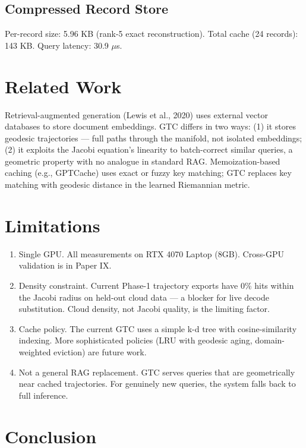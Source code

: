 \documentclass[11pt]{article}
\begin{document}
\subsection{Compressed Record Store}

Per-record size: 5.96 KB (rank-5 exact reconstruction). Total cache
(24 records): 143 KB. Query latency: 30.9 $\mu$s.

\section{Related Work}

Retrieval-augmented generation (Lewis et al., 2020) uses external vector
databases to store document embeddings. GTC differs in two ways: (1) it
stores geodesic trajectories --- full paths through the manifold,
not isolated embeddings; (2) it exploits the Jacobi equation's
linearity to batch-correct similar queries, a geometric property with
no analogue in standard RAG. Memoization-based caching (e.g., GPTCache)
uses exact or fuzzy key matching; GTC replaces key matching with
geodesic distance in the learned Riemannian metric.

\section{Limitations}

\begin{enumerate}
\item Single GPU. All measurements on RTX 4070 Laptop (8GB).
      Cross-GPU validation is in Paper IX.
\item Density constraint. Current Phase-1 trajectory exports
      have 0\% hits within the Jacobi radius on held-out cloud data ---
      a blocker for live decode substitution. Cloud density, not Jacobi
      quality, is the limiting factor.
\item Cache policy. The current GTC uses a simple k-d tree with
      cosine-similarity indexing. More sophisticated policies (LRU with
      geodesic aging, domain-weighted eviction) are future work.
\item Not a general RAG replacement. GTC serves queries that
      are geometrically near cached trajectories. For genuinely new
      queries, the system falls back to full inference.
\end{enumerate}

\section{Conclusion}
\end{document}
